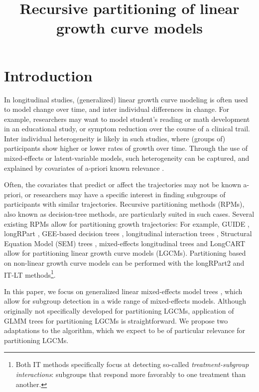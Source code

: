 \documentclass[doc,floatsintext,natbib]{apa7}
\title{Recursive partitioning of linear growth curve models}
\begin{document}

\maketitle


\section{Introduction}
\label{sec:Introduction}


In longitudinal studies, (generalized) linear growth curve modeling is often used to model change over time, and inter individual differences in change. For example, researchers may want to model student's reading or math development in an educational study, or symptom reduction over the course of a clinical trail. Inter individual heterogeneity is likely in such studies, where (groups of) participants show higher or lower rates of growth over time. Through the use of mixed-effects or latent-variable models, such heterogeneity can be captured, and explained by covariates of a-priori known relevance \citep{NeisyMatt18}.

Often, the covariates that predict or affect the trajectories may not be known a-priori, or researchers may have a specific interest in finding subgroups of participants with similar trajectories. Recursive partitioning methods (RPMs), also known as decision-tree methods, are particularly suited in such cases. Several existing RPMs allow for partitioning growth trajectories: For example, GUIDE \citep{Loh02}, longRPart \citep{AbdoyLeBl02}, GEE-based decision trees \citep{Lee05}, longitudinal interaction trees \cite[IT; ][]{SuyMene11}, Structural Equation Model (SEM) trees \citep{BranyOert13, ArnoyVoel21}, mixed-effects longitudinal trees \citep[MELT; ][]{EoyCho14} and LongCART \cite{KundyHare19} allow for partitioning linear growth curve models (LGCMs). Partitioning based on non-linear growth curve models can be performed with the longRPart2 \citep{StegyJaco18} and IT-LT \citep{WeiyLiu20} methods\footnote{Both IT methods specifically focus at detecting so-called \textit{treatment-subgroup interactions}: subgroups that respond more favorably to one treatment than another.}.

In this paper, we focus on generalized linear mixed-effects model trees \citep[GLMM trees; ][]{FokkySmit18}, which allow for subgroup detection in a wide range of mixed-effects models. Although originally not specifically developed for partitioning LGCMs, application of GLMM trees for partitioning LGCMs is straightforward. We propose two adaptations to the algorithm, which we expect to be of particular relevance for partitioning LGCMs. 
\end{document}
